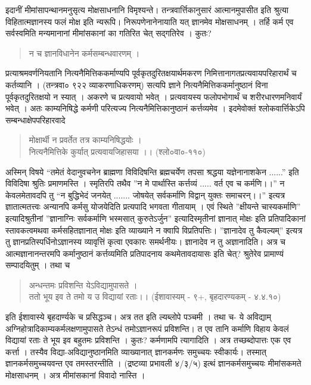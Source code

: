 इदानीं मीमांसापन्थानमनुसृत्य मोक्षसाधनानि विमृश्यन्ते। तन्त्रवार्त्तिकानुसारं आत्मानमुपासीत इति श्रुत्या विहितात्मज्ञानस्य फलं मोक्ष इति न्यरूपि। निरूपणेनानेनायाति यत् ज्ञानमेव मोक्षसाधनम् । तर्हि कर्म एव सर्वस्वमिति मन्यमानानां मीमांसकानां का गतिरित चेत्  सद्गतिरेव । कुतः?
\begin{verse}
न च ज्ञानविधानेन कर्मसम्बन्धवारणम् ।
\end{verse}
प्रत्याश्रमवर्णनियतानि नित्यनैमित्तिककर्माण्यपि पूर्वकृतदुरितक्षयार्थमकरण निमित्तानागतप्रत्यवायपरिहारार्थं च कर्तव्यानि । (तन्त्रवा० ९२२ व्याकरणाधिकरणम्) सत्यपि ज्ञाने नित्यनैमित्तिककर्मानुष्ठानं विना पूर्वकृतदुरितक्षयो न स्यात् । अकरणे च प्रत्यवायो भवेत् । प्रत्यवायस्य फलोपभोगार्थं च शरीरधारणमनिवार्यं भवेत् । अतः काम्यनिषिद्धे कर्मणी परित्यज्य नित्यनैमित्तिकानुष्ठानं कर्त्तव्यमेव । इदमेवोक्तं श्लोकवार्त्तिकेऽपि सम्बन्धाक्षेपपरिहारवादे 
\begin{verse}
मोक्षार्थी न प्रवर्तेत तत्र काम्यनिषिद्धयोः  ।\\
नित्यनैमित्तिके कुर्यात् प्रत्यवायजिहासया ।। (श्लो०वा०-११०)
\end{verse}
अस्मिन् विषये “तमेतं वेदानुवचनेन ब्राह्मणा विविदिषन्ति ब्रह्मचर्येण तपसा श्रद्धया यज्ञेनानाशकेन ......” इति विविदिषा श्रुतिः प्रमाणमस्ति । स्मृतिरपि तथैव ”न मे पार्थास्ति कर्त्तव्यं ..... वर्त एव च कर्मणि।।” न केवलमेतावदपि तु “न बुद्धिभेदं जनयेत् ....... जोषयेत् सर्वकर्माणि विद्वान् युक्तः समाचरन्।।” इत्यत्र ज्ञातात्मतत्त्वः अन्यानपि कर्मसु योजयेदिति प्रत्यपादि भगवता गीतायाम् । एवं स्थिते ”क्षीयन्ते चास्यकर्माणि” इत्यादिश्रुतीनां ”ज्ञानाग्निः सर्वकर्माणि भस्मसात् कुरुतेऽर्जुन” इत्यादिस्मृतीनां ज्ञानात् मोक्षः इति प्रतिपादिकानां स्तावकत्वमथवा कर्मसहितज्ञानात् मोक्षः इति व्याख्याने न क्वापि विप्रतिपत्तिः। ”ज्ञानादेव तु कैवल्यम्” इत्यत्र तु ज्ञानप्रतिस्पर्धिनोऽज्ञानस्य व्यावृत्तिं कृत्वा एवकारः समर्थनीयः। ज्ञानादेव न तु अज्ञानादिति। अत्र च आत्मज्ञानानन्तरमपि कर्मानुष्ठानं कर्त्तव्यमिति प्रतिपादनाय कथमेतावदायासः इति चेत्? श्रुतेरेव प्रामाण्यं सम्पादयितुम् । तथा च 
\begin{verse}
अन्धन्तमः प्रविशन्ति येऽविद्यामुपासते ।\\
ततो भूय इव ते तमो य उ विद्यायां रताः।। (ईशावास्यम् - ९+, बृहदारण्यकम् - ४.४.१०)
\end{verse}
इति ईशावास्ये बृहदार्ण्यके च प्रसिद्धञ्च। अत्र तत इति ल्यब्लोपे पञ्चमी । तथा च- ये अविद्याम् अग्निहोत्रादिकाम्यकर्मलक्षणामुपासते तेऽन्धं तमोऽज्ञानरूपं प्रविशन्ति। त एव तानि कर्माणि विहाय केवलं विद्यायां रताः ते भूय इव बहुतमः प्रविशन्ति । कुतः? कर्मणामपि त्यागादिति । अत्र तच्छब्दोपात्तः एक एव कर्त्ता । तस्यैव विद्या-अविद्यानुष्ठानमिति व्याख्यानात् ज्ञानकर्मणः समुच्चयः स्वीकार्यः। तस्मात् ज्ञानकर्मसमुच्चयवन्त एव तमस्तरन्तीति । (द्रष्टव्या प्रभावली ४/३/५) इत्थं ज्ञानकर्मसमुच्चयः मीमांसकमते मोक्षसाधनम् । अत्र मीमांसकानां विवादो नास्ति ।

